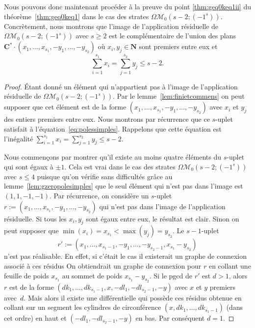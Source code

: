 \documentclass[JEP,XML,SOM,Unicode,francais,NoFloatCountersInSection,published]{cedram}
\let\mathcal\mathscr
\newcommand{\CC}{\mathbf{C}}
\newcommand{\NN}{\mathbf{N}}
\newcommand{\omoduli}[1][g]{{\Omega\mathcal M}_{\!#1}}
\theoremstyle{definition}
\begin{document}
Nous pouvons donc maintenant procéder à la preuve du point \eqref{thm:geq0keq1ii} du théorème~\ref{thm:geq0keq1} dans le cas des strates $\omoduli[0](s-2;(-1^{s}))$. Concrètement, nous montrons que l'image de l'application résiduelle de $\omoduli[0](s-2;(-1^{s}))$ avec $s\geq2$ est le complémentaire de l'union des plans $\CC^{\ast} \cdot (x_{1},\dots,x_{s_{1}},-y_{1},\dots,-y_{s_{2}})$ où $x_{i},y_{j} \in \NN$ sont premiers entre eux et
\begin{equation*}
\sum_{i=1}^{s_{1}} x_{i} = \sum_{j=1}^{s_{2}} y_{j} \leq s-2.
\end{equation*}
\begin{proof}
Étant donné un élément qui n’appartient pas à l'image de l'application résiduelle de $\omoduli[0](s-2;(-1^{s}))$. Par le lemme~\ref{lem:finietcommens} on peut supposer que cet élément est de la forme $(x_{1},\dots,x_{s_{1}},-y_{1},\dots,-y_{s_{2}})$ avec $x_{i}$ et $y_{j}$ des entiers premiers entre eux. Nous montrons par récurrence que ce $s$-uplet satisfait à l'équation~\eqref{eq:polessimples}.
Rappelons que cette équation est l'inégalité $\sum_{i=1}^{s_{1}} x_{i} = \sum_{j=1}^{s_{2}} y_{j} \leq s-2$.

Nous commençons par montrer qu'il existe au moins quatre éléments du $s$-uplet qui sont égaux à $\pm1$. Cela est vrai dans le cas des strates $\omoduli[0](s-2;(-1^{s}))$ avec $s\leq 4$ puisque qu'on vérifie sans difficultés grâce au lemme~\ref{lem:gzeropolesimples} que le seul élément qui n'est pas dans l'image est $(1,1,-1,-1)$. Par récurrence, on considère un $s$-uplet $r := (x_{1},\dots,x_{s_{1}},-y_{1},\dots,-y_{s_{2}})$ qui n'est pas dans l'image de l'application résiduelle. Si tous les $x_{i},y_{j}$ sont égaux entre eux, le résultat est clair. Sinon on peut supposer que $\min(x_{i}) = x_{s_{1}} < \max(y_{j}) = y_{s_{2}}$. Le $s-1$-uplet\vspace*{-3pt}\enlargethispage{.5\baselineskip}
\[
r' :=(x_{1},\dots,x_{s_{1}-1},-y_{1},\dots,-y_{s_{2}-1},x_{s_{1}}-y_{s_{2}})
\]
n'est pas réalisable. En effet, si c'était le cas il existerait un graphe de connexion associé à ces résidus On obtiendrait un graphe de connexion pour $r$ en collant une feuille de poids $x_{s_{1}}$ au sommet de poids $x_{s_{1}}-y_{s_{2}}$. Si le pgcd de $r'$ est $d > 1$, alors~$r$ est de la forme $(dk_{1},\dots,dk_{s_{1}-1},x,-dl_{1},-dl_{s_{2}-1},-y)$ avec $x$ et $y$ premiers avec~$d$. Mais alors il existe une différentielle qui possède ces résidus obtenue en collant sur un segment les cylindres de circonférence $(x,dk_{1},\dots,dk_{s_{1}-1})$ (dans cet ordre) en haut et $(-dl_{1},-dl_{s_{2}-1},-y)$ en bas. Par conséquent $d=1$.


\end{proof}
\end{document}
